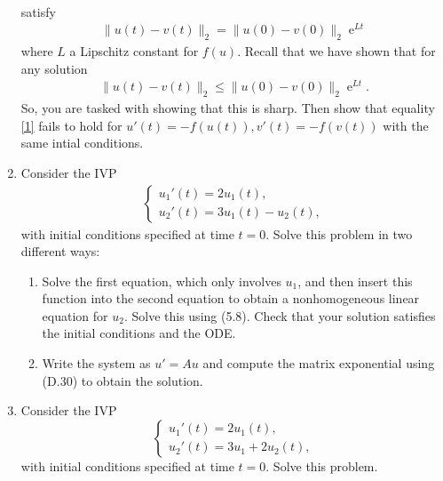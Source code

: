 \documentclass[10pt]{amsart}
\DeclareMathOperator{\E}{e}
\begin{document}
\begin{enumerate}[label={\bf Problem~{\arabic*}:}]
\begin{align*}
  \end{align*}
  satisfy
  \begin{align}\label{1}
    \|u(t) - v(t)\|_2 = \|u(0) - v(0)\|_2 \E^{L t}
  \end{align}
  where $L$ a Lipschitz constant for $f(u)$.  Recall that we have shown that for any solution
  \begin{align*}
    \|u(t) - v(t)\|_2 \leq \|u(0) - v(0)\|_2 \E^{L t}.
  \end{align*}
  So, you are tasked with showing that this is sharp.  Then show that equality \eqref{1} fails to hold for $u'(t) = - f(u(t)),v'(t) = - f(v(t))$ with the same intial conditions.
  \mline
  \item Consider the IVP
\begin{align*}
\begin{cases}
u_1'(t) = 2u_1(t),\\
u_2'(t) = 3u_1(t) - u_2(t),
\end{cases}
\end{align*}
with initial conditions specified at time $t=0$.  Solve this problem in two
different ways:

\begin{enumerate}
\item Solve the first equation, which only involves $u_1$, and then insert
this function into the second equation to obtain a nonhomogeneous linear
equation for $u_2$.  Solve this using (5.8).  
Check that your solution satisfies the initial conditions and the ODE.

\item Write the system as $u' = Au$ and compute the matrix exponential using
(D.30) to obtain the solution.
\end{enumerate}

\mline

\item Consider the IVP
\begin{equation*}
\begin{cases}
u_1'(t) = 2u_1(t),\\
u_2'(t) = 3u_1 + 2u_2(t),
\end{cases}
\end{equation*}
with initial conditions specified at time $t=0$.  Solve this problem.
\mline


\end{enumerate}
\end{document}

